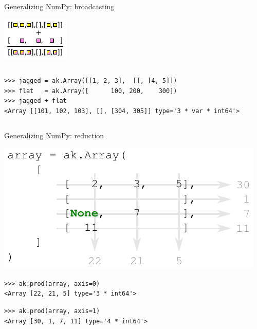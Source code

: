 \documentclass[aspectratio=169]{beamer}
\begin{document}
\begin{frame}[fragile]{Generalizing NumPy: broadcasting}
\begin{center}
\includegraphics[width=0.4\linewidth]{img/cartoon-broadcasting.pdf}
\end{center}

\begin{columns}
\begin{verbatim}
>>> jagged = ak.Array([[1, 2, 3],  [], [4, 5]])
>>> flat   = ak.Array([      100, 200,    300])
>>> jagged + flat
<Array [[101, 102, 103], [], [304, 305]] type='3 * var * int64'>
\end{verbatim}
\end{columns}
\end{frame}

\begin{frame}[fragile]{Generalizing NumPy: reduction}
\vspace{0.5 cm}

\includegraphics[width=8 cm]{img/reduction.pdf}


\begin{verbatim}
>>> ak.prod(array, axis=0)
<Array [22, 21, 5] type='3 * int64'>
\end{verbatim}

\begin{verbatim}
>>> ak.prod(array, axis=1)
<Array [30, 1, 7, 11] type='4 * int64'>
\end{verbatim}
\end{frame}
\end{document}
